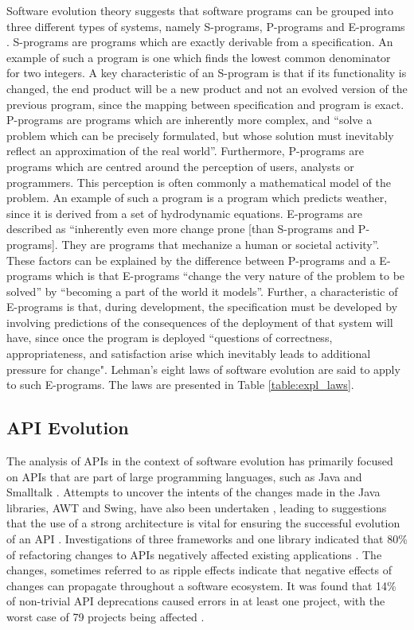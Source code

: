 \documentclass{sig-alternate}
\begin{document}
Software evolution theory suggests that software programs can be grouped into three different types of systems, namely S-programs, P-programs and E-programs \cite{lehman1980programs}. S-programs are programs which are exactly derivable from a specification. An example of such a program is one which finds the lowest common denominator for two integers. A key characteristic of an S-program is that if its functionality is changed, the end product will be a new product and not an evolved version of the previous program, since the mapping between specification and program is exact. P-programs are programs which are inherently more complex, and ``solve a problem which can be precisely formulated, but whose solution must inevitably reflect an approximation of the real world''. Furthermore, P-programs are programs which are centred around the perception of users, analysts or programmers. This perception is often commonly a mathematical model of the problem. An example of such a program is a program which predicts weather, since it is derived from a set of hydrodynamic equations. E-programs are described as ``inherently even more change prone [than S-programs and P-programs]. They are programs that mechanize a human or societal activity''. These factors can be explained by the difference between P-programs and a E-programs which is that E-programs ``change the very nature of the problem to be solved'' by ``becoming a part of the world it models''. Further, a characteristic of E-programs is that, during development, the specification must be developed by involving predictions of the consequences of the deployment of that system will have, since once the program is deployed ``questions of correctness, appropriateness, and satisfaction arise which inevitably leads to additional pressure for change". Lehman's eight laws of software evolution are said to apply to such E-programs. The laws are presented in Table \ref{table:expl_laws}. 




\subsection{API Evolution} \label{related_work}
The analysis of APIs in the context of software evolution has primarily focused on APIs that are part of large programming languages, such as Java \cite{hou2011exploring, shi2011empirical} and Smalltalk \cite{robbes2012developers}. Attempts to uncover the intents of the changes made in the Java libraries, AWT and Swing, have also been undertaken \cite{hou2011exploring}, leading to suggestions that the use of a strong architecture is vital for ensuring the successful evolution of an API \cite{hou2011exploring}. Investigations of three frameworks and one library indicated that 80\% of refactoring changes to APIs negatively affected existing applications \cite{dig2005role}. The changes, sometimes referred to as ripple effects \cite{robbes2012developers} indicate that negative effects of changes can propagate throughout a software ecosystem. It was found that 14\% of non-trivial API deprecations caused errors in at least one project, with the worst case of 79 projects being affected \cite{robbes2012developers}.
\end{document}

